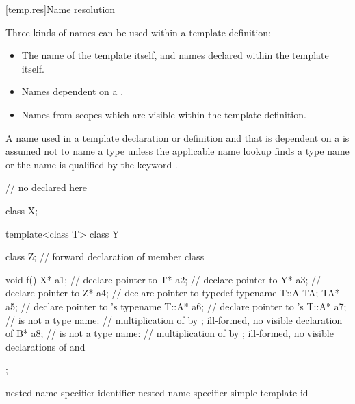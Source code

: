 [temp.res]{Name resolution}

\pnum
{}%
%
Three kinds of names can be used within a template definition:

\begin{itemize}
\item
The name of the template itself,
and names declared within the template itself.
\item
Names dependent on a
.
\item
Names from scopes which are visible within the template definition.
\end{itemize}

\pnum
A name used in a template declaration or definition and that is
dependent on a
is assumed not to name a type unless
the applicable name lookup finds a type name or the name
is qualified by the keyword
.
\begin{example}

\begin{codeblock}
// no  declared here

class X;

template<class T> class Y {
  class Z;                      // forward declaration of member class

  void f() {
    X* a1;                      // declare pointer to 
    T* a2;                      // declare pointer to 
    Y* a3;                      // declare pointer to 
    Z* a4;                      // declare pointer to 
    typedef typename T::A TA;
    TA* a5;                     // declare pointer to 's 
    typename T::A* a6;          // declare pointer to 's 
    T::A* a7;                   //  is not a type name:
                                // multiplication of  by ; ill-formed, no visible declaration of 
    B* a8;                      //  is not a type name:
                                // multiplication of  by ; ill-formed, no visible declarations of  and 
  }
};
\end{codeblock}
\end{example}

\begin{bnf}
\br
   nested-name-specifier identifier\br
   nested-name-specifier  simple-template-id
\end{bnf}

